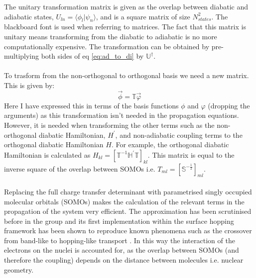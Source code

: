 The unitary transformation matrix is given as the overlap between diabatic and adiabatic states, $U_{ln} = \langle \phi_{l} | \psi_{n} \rangle$, and is a square matrix of size $N_{states} ^2$. The blackboard font is used when referring to matrices. The fact that this matrix is unitary means transforming from the diabatic to adiabatic is no more computationally expensive. The transformation can be obtained by pre-multiplying both sides of eq \eqref{eq:ad_to_di} by $\mathbb{U}^{\dagger}$.
\\\\
To trasform from the non-orthogonal to orthogonal basis we need a new matrix. This is given by:
\begin{equation}
  \vec{\phi} = \mathbb{T} \vec{\varphi}
  \label{eq:orth_to_nonorth}
\end{equation}
Here I have expressed this in terms of the basis functions $\phi$ and $\varphi$ (dropping the arguments) as this transformation isn't needed in the propagation equations. However, it is needed when transforming the other terms such as the non-orthogonal diabatic Hamiltonian, $H^{'}$, and non-adiabatic coupling terms to the orthogonal diabatic Hamiltonian $H$. For example, the orthogonal diabatic Hamiltonian is calculated as $H_{kl} = \left[\mathbb{T}^{-1} \mathbb{H}^{'} \mathbb{T} \right]_{kl}$. This matrix is equal to the inverse square of the overlap between SOMOs i.e. $T_{ml} = [\mathbb{S}^{-\frac{1}{2}}]_{ml}$.
\\\\
Replacing the full charge transfer determinant with parametrised singly occupied molecular orbitals (SOMOs) makes the calculation of the relevant terms in the propagation of the system very efficient. The approximation has been scrutinised before in the group
\cite{giannini_crossover_2018, carof_detailed_2017, gajdos_ultrafast_2014, Gajdos2013Mar, spencer_confronting_2016, spencer_fob-sh:_2016} and its first implementation within the surface hopping framework has been shown to reproduce known phenomena such as the crossover from band-like to hopping-like transport \cite{giannini_crossover_2018}. In this way the interaction of the electrons on the nuclei is accounted for, as the overlap between SOMOs (and therefore the coupling) depends on the distance between molecules i.e. nuclear geometry.
